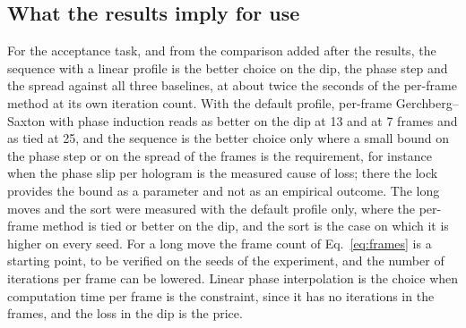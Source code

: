 \subsection{What the results imply for use}

For the acceptance task, and from the comparison added after the results, the sequence with a linear profile is the better choice on the dip, the phase step and the spread against all three baselines, at about twice the seconds of the per-frame method at its own iteration count. With the default profile, per-frame Gerchberg--Saxton with phase induction reads as better on the dip at 13 and at 7 frames and as tied at 25, and the sequence is the better choice only where a small bound on the phase step or on the spread of the frames is the requirement, for instance when the phase slip per hologram is the measured cause of loss; there the lock provides the bound as a parameter and not as an empirical outcome. The long moves and the sort were measured with the default profile only, where the per-frame method is tied or better on the dip, and the sort is the case on which it is higher on every seed. For a long move the frame count of Eq.~\ref{eq:frames} is a starting point, to be verified on the seeds of the experiment, and the number of iterations per frame can be lowered. Linear phase interpolation is the choice when computation time per frame is the constraint, since it has no iterations in the frames, and the loss in the dip is the price.
